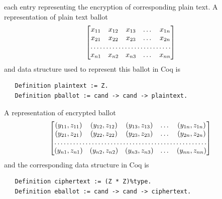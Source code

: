 \documentclass{llncs}
\begin{document}
  each entry representing the encryption of corresponding plain text. 
  A representation of plain text ballot  
  \[  
  \begin{bmatrix}
    x_{11}       & x_{12} & x_{13} & \dots & x_{1n} \\
    x_{21}       & x_{22} & x_{23} & \dots & x_{2n} \\
    \hdotsfor{5} \\
    x_{n1}       & x_{n2} & x_{n3} & \dots & x_{nn}
  \end{bmatrix}\] and data structure used to represent this ballot in 
  Coq is
  \begin{verbatim}
   Definition plaintext := Z.
   Definition pballot := cand -> cand -> plaintext.
  \end{verbatim}
  A representation of encrypted ballot 
  \[  
  \begin{bmatrix}
    (y_{11}, z_{11}) & (y_{12}, z_{12}) & (y_{13}, z_{13}) & \dots & (y_{1n}, z_{1n}) \\
    (y_{21}, z_{21}) & (y_{22}, z_{22}) & (y_{23}, z_{23}) & \dots & (y_{2n}, z_{2n}) \\
    \hdotsfor{5} \\
    (y_{n1}, z_{n1}) & (y_{n2}, z_{n2}) & (y_{n3}, z_{n3}) & \dots & (y_{nn}, z_{nn})
  \end{bmatrix}\] and the corresponding data structure in Coq is 
  \begin{verbatim}
   Definition ciphertext := (Z * Z)%type.
   Definition eballot := cand -> cand -> ciphertext.
  \end{verbatim}
     
\end{document}

